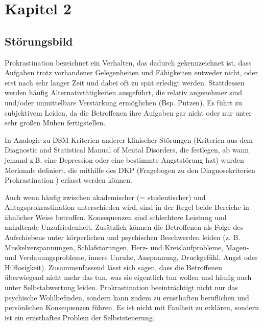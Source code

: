 \chapter{Kapitel 2}
\label{cha:kapitel-2}

\section{Störungsbild}
\label{sec:störungsbild}
Prokrastination bezeichnet ein Verhalten, das dadurch gekennzeichnet ist, dass Aufgaben trotz vorhandener Gelegenheiten und Fähigkeiten entweder nicht, oder erst nach sehr langer Zeit und dabei oft zu spät erledigt werden. Stattdessen werden häufig Alternativtätigkeiten ausgeführt, die relativ angenehmer sind und/oder unmittelbare Verstärkung ermöglichen (Bsp. Putzen). Es führt zu subjektivem Leiden, da die Betroffenen ihre Aufgaben gar nicht oder nur unter sehr großen Mühen fertigstellen.

In Analogie zu DSM-Kriterien anderer klinischer Störungen (Kriterien aus dem Diagnostic and Statistical Manual of Mental Disorders, die festlegen, ab wann jemand z.B. eine Depression oder eine bestimmte Angststörung hat) wurden Merkmale definiert, die mithilfe des DKP (Fragebogen zu den Diagnosekriterien Prokrastination \cite{hoecker:2013}) erfasst werden können\cite{download}.

Auch wenn häufig zwischen akademischer (= studentischer) und Alltagsprokrastination unterschieden wird, sind in der Regel beide Bereiche in ähnlicher Weise betroffen. Konsequenzen sind schlechtere Leistung und anhaltende Unzufriedenheit. Zusätzlich können die Betroffenen als Folge des Aufschiebens unter körperlichen und psychischen Beschwerden leiden (z. B. Muskelverspannungen, Schlafstörungen, Herz- und Kreislaufprobleme, Magen- und Verdauungsprobleme, innere Unruhe, Anspannung, Druckgefühl, Angst oder Hilflosigkeit). Zusammenfassend lässt sich sagen, dass die Betroffenen überwiegend nicht mehr das tun, was sie eigentlich tun wollen und häufig auch unter Selbstabwertung leiden. Prokrastination beeinträchtigt nicht nur das psychische Wohlbefinden, sondern kann zudem zu ernsthaften beruflichen und persönlichen Konsequenzen führen. Es ist nicht mit Faulheit zu erklären, sondern ist ein ernsthaftes Problem der Selbststeuerung.
